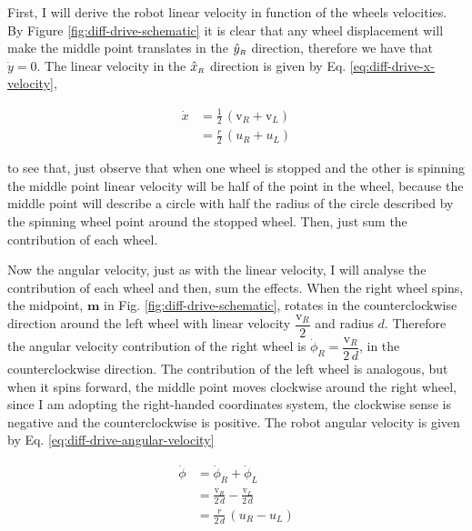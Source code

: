 \documentclass[12pt]{article}
\begin{document}
First, I will derive the robot linear velocity in function of the wheels velocities. By Figure \ref{fig:diff-drive-schematic} it is clear that any wheel displacement will make the middle point translates in the $\hat{y}_\mathsmaller{R}$ direction, therefore we have that $\dot{y} = 0$. The linear velocity in the $\hat{x}_\mathsmaller{R}$ direction is given by Eq. \ref{eq:diff-drive-x-velocity},

\begin{equation}
\begin{aligned}
    \dot{x} &= \frac{1}{2} \,(\mathrm{v}_R + \mathrm{v}_L)\\
    &= \frac{r}{2} \,(u_R + u_L)
\end{aligned}
    \label{eq:diff-drive-x-velocity}
\end{equation}

to see that, just observe that when one wheel is stopped and the other is spinning the middle point linear velocity will be half of the point in the wheel, because the middle point will describe a circle with half the radius of the circle described by the spinning wheel point around the stopped wheel. Then, just sum the contribution of each wheel.

Now the angular velocity, just as with the linear velocity, I will analyse the contribution of each wheel and then, sum the effects. When the right wheel spins, the midpoint, $\boldsymbol{m}$ in Fig. \ref{fig:diff-drive-schematic}, rotates in the counterclockwise direction around the left wheel with linear velocity $\dfrac{\mathrm{v}_R}{2}$ and radius $d$. Therefore the angular velocity contribution of the right wheel is $\dot{\phi}_R = \dfrac{\mathrm{v}_R}{2\,d}$, in the counterclockwise direction. The contribution of the left wheel is analogous, but when it spins forward, the middle point moves clockwise around the right wheel, since I am adopting the right-handed coordinates system, the clockwise sense is negative and the counterclockwise is positive. The robot angular velocity is given by Eq. \ref{eq:diff-drive-angular-velocity}

\begin{equation}
\begin{aligned}
    \dot{\phi} &= \dot{\phi}_R + \dot{\phi}_L\\
    &= \frac{\mathrm{v}_R}{2\,d} - \frac{\mathrm{v}_L}{2\,d}\\
    &= \frac{r}{2\,d} \, (u_R - u_L)
\end{aligned}
\label{eq:diff-drive-angular-velocity}
\end{equation}
\end{document}
